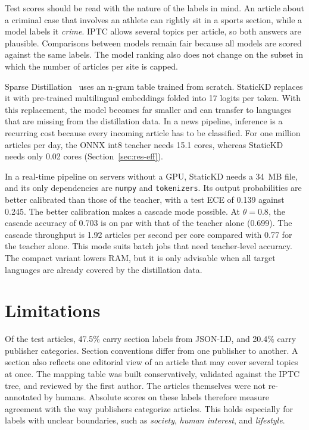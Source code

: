 \documentclass[journal]{IEEEtran}
\begin{document}
Test scores should be read with the nature of the labels in mind. An article about a criminal case that involves an athlete can rightly sit in a sports section, while a model labels it \emph{crime}. IPTC allows several topics per article, so both answers are plausible. Comparisons between models remain fair because all models are scored against the same labels. The model ranking also does not change on the subset in which the number of articles per site is capped.

Sparse Distillation~\cite{ye2022sparse} uses an n-gram table trained from scratch. StaticKD replaces it with pre-trained multilingual embeddings folded into 17 logits per token. With this replacement, the model becomes far smaller and can transfer to languages that are missing from the distillation data. In a news pipeline, inference is a recurring cost because every incoming article has to be classified. For one million articles per day, the ONNX int8 teacher needs 15.1 cores, whereas StaticKD needs only 0.02 cores (Section~\ref{sec:res-eff}).

In a real-time pipeline on servers without a GPU, StaticKD needs a 34~MB file, and its only dependencies are \texttt{numpy} and \texttt{tokenizers}. Its output probabilities are better calibrated than those of the teacher, with a test ECE of 0.139 against 0.245. The better calibration makes a cascade mode possible. At $\theta=0.8$, the cascade accuracy of 0.703 is on par with that of the teacher alone (0.699). The cascade throughput is 1.92 articles per second per core compared with 0.77 for the teacher alone. This mode suits batch jobs that need teacher-level accuracy. The compact variant lowers RAM, but it is only advisable when all target languages are already covered by the distillation data.

\section{Limitations}
\label{sec:limitations}
Of the test articles, 47.5\% carry section labels from JSON-LD, and 20.4\% carry publisher categories. Section conventions differ from one publisher to another. A section also reflects one editorial view of an article that may cover several topics at once. The mapping table was built conservatively, validated against the IPTC tree, and reviewed by the first author. The articles themselves were not re-annotated by humans. Absolute scores on these labels therefore measure agreement with the way publishers categorize articles. This holds especially for labels with unclear boundaries, such as \emph{society}, \emph{human interest}, and \emph{lifestyle}.
\end{document}
